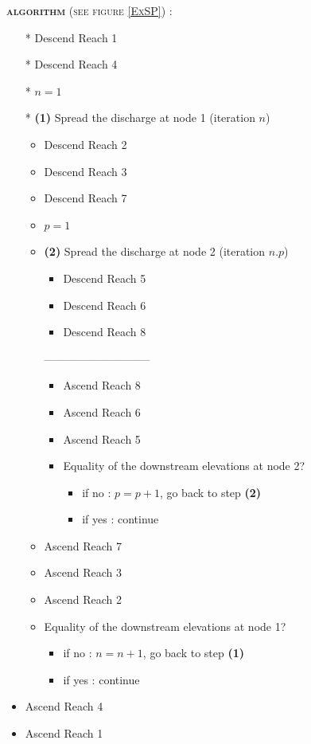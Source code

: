 \textsc{\textbf{algorithm} (see figure \ref{ExSP}) :}
\begin{itemize}
 \item[*] Descend Reach 1
 \item[*] Descend Reach 4
 \item[*] $n = 1$
 \item[*] \textbf{(1)} Spread the discharge at node 1 (iteration $n$)
 \begin{itemize}
  \item Descend Reach 2
  \item Descend Reach 3
  \item Descend Reach 7
  \item $p = 1$
  \item \textbf{(2)} Spread the discharge at node 2 (iteration $n.p$)
  \begin{itemize}
   \item Descend Reach 5
   \item Descend Reach 6
   \item Descend Reach 8
  \end{itemize}
  -----------------------------
  \begin{itemize}
   \item Ascend Reach 8
   \item Ascend Reach 6
   \item Ascend Reach 5
   \item Equality of the downstream elevations at node 2?
   \begin{itemize}
    \item if no : $p = p + 1$, go back to step \textbf{(2)}
    \item if yes : continue
   \end{itemize}
  \end{itemize}
  \item Ascend Reach 7
  \item Ascend Reach 3
  \item Ascend Reach 2
  \item Equality of the downstream elevations at node 1?
  \begin{itemize}
    \item if no : $n = n + 1$, go back to step \textbf{(1)}
    \item if yes : continue
   \end{itemize}
  \end{itemize}
 \item Ascend Reach 4
 \item Ascend Reach 1
\end{itemize}


